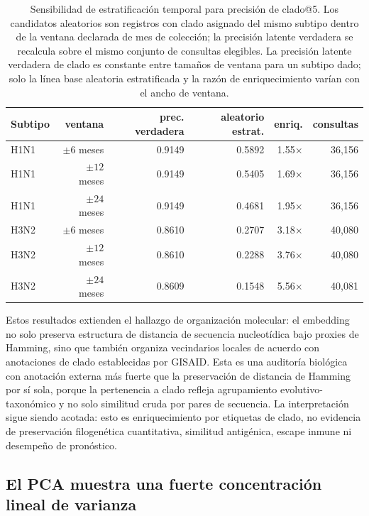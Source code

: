 \documentclass[11pt]{article}
\begin{document}
\begin{table}[H]
\centering
\caption{Sensibilidad de estratificación temporal para precisión de clado@5. Los candidatos aleatorios son registros con clado asignado del mismo subtipo dentro de la ventana declarada de mes de colección; la precisión latente verdadera se recalcula sobre el mismo conjunto de consultas elegibles. La precisión latente verdadera de clado es constante entre tamaños de ventana para un subtipo dado; solo la línea base aleatoria estratificada y la razón de enriquecimiento varían con el ancho de ventana.}
\label{tab:clade-temporal-stratified}
\small
\begin{tabular}{lrrrrr}
\toprule
Subtipo & ventana & prec. verdadera & aleatorio estrat. & enriq. & consultas \\
\midrule
H1N1 & $\pm 6$ meses & 0.9149 & 0.5892 & 1.55$\times$ & 36,156 \\
H1N1 & $\pm 12$ meses & 0.9149 & 0.5405 & 1.69$\times$ & 36,156 \\
H1N1 & $\pm 24$ meses & 0.9149 & 0.4681 & 1.95$\times$ & 36,156 \\
H3N2 & $\pm 6$ meses & 0.8610 & 0.2707 & 3.18$\times$ & 40,080 \\
H3N2 & $\pm 12$ meses & 0.8610 & 0.2288 & 3.76$\times$ & 40,080 \\
H3N2 & $\pm 24$ meses & 0.8609 & 0.1548 & 5.56$\times$ & 40,081 \\
\bottomrule
\end{tabular}
\normalsize
\end{table}

Estos resultados extienden el hallazgo de organización molecular: el embedding no solo preserva estructura de distancia de secuencia nucleotídica bajo proxies de Hamming, sino que también organiza vecindarios locales de acuerdo con anotaciones de clado establecidas por GISAID. Esta es una auditoría biológica con anotación externa más fuerte que la preservación de distancia de Hamming por sí sola, porque la pertenencia a clado refleja agrupamiento evolutivo-taxonómico y no solo similitud cruda por pares de secuencia. La interpretación sigue siendo acotada: esto es enriquecimiento por etiquetas de clado, no evidencia de preservación filogenética cuantitativa, similitud antigénica, escape inmune ni desempeño de pronóstico.

\subsection{El PCA muestra una fuerte concentración lineal de varianza}
\end{document}
